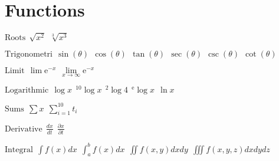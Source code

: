 \documentclass{article}
\begin{document}
    \newpage
    \section{Functions}

    $\textrm{Roots} \: \: \sqrt{x^2} \: \: 
    \sqrt[3]{x^3}
    $

    $\textrm{Trigonometri} \: \:
    \sin(\theta) \: \: 
    \cos(\theta) \: \: 
    \tan(\theta) \: \: 
    \sec(\theta) \: \:
    \csc(\theta) \: \:
    \cot(\theta) \: \:
    $

    $\textrm{Limit} \: \:
    \lim \textrm{e}^{-x} \: \:
    \lim\limits_{x \to \infty} \textrm{e}^{-x}
    $

    $\textrm{Logarithmic} \: \:
    \log{x} \: \: 
    ^{10} \log{x} \: \:
    ^{2} \log {4} \: \:
    ^{\textrm{e}} \log {x} \: \:
    \ln {x}
    $

    $\textrm{Sums} \: \:
    \sum x \: \:
    \sum_{i=1}^{10} t_i
    $

    $\textrm{Derivative} \: \:
    \frac{dx}{dt} \: \:
    \frac{\partial x}{\partial t}
    $

    $\textrm{Integral} \: \:
    \int f(x) dx \: \:
    \int_a^b f(x) dx \: \:
    \iint f(x, y) dx dy \: \:
    \iiint f(x, y, z) dx dy dz \: \:
    $
\end{document}
